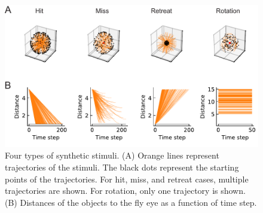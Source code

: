 \documentclass[pdftex,9pt,lineno]{elife}
\begin{document}
\begin{figure}
\includegraphics[width=\linewidth]{figures/stimuli_1_paper.pdf}
\caption{Four types of synthetic stimuli. (A) Orange lines represent trajectories of the stimuli. The black dots represent the starting points of the trajectories. For hit, miss, and retreat cases, multiple trajectories are shown. For rotation, only one trajectory is shown. (B) Distances of the objects to the fly eye as a function of time step.}
\label{fig:stimuli_traj}
\end{figure}
\end{document}
